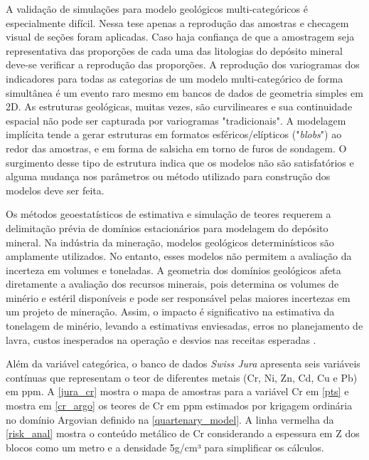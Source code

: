 A validação de simulações para modelo geológicos multi-categóricos é especialmente difícil. Nessa tese apenas a reprodução das amostras e checagem visual de seções foram aplicadas. Caso haja confiança de que a amostragem seja representativa das proporções de cada uma das litologias do depósito mineral deve-se verificar a reprodução das proporções. A reprodução dos variogramas dos indicadores para todas as categorias de um modelo multi-categórico de forma simultânea é um evento raro mesmo em bancos de dados de geometria simples em 2D. As estruturas geológicas, muitas vezes, são curvilineares e sua continuidade espacial não pode ser capturada por variogramas "tradicionais". A modelagem implícita tende a gerar estruturas em formatos esféricos/elípticos ("\textit{blobs}") ao redor das amostras, e em forma de salsicha em torno de furos de sondagem. O surgimento desse tipo de estrutura indica que os modelos não são satisfatórios e alguma mudança nos parâmetros ou método utilizado para construção dos modelos deve ser feita.

Os métodos geoestatísticos de estimativa e simulação de teores requerem a delimitação prévia de domínios estacionários para modelagem do depósito mineral. Na indústria da mineração, modelos geológicos determinísticos são amplamente utilizados. No entanto, esses modelos não permitem a avaliação da incerteza em volumes e toneladas. A geometria dos domínios geológicos afeta diretamente a avaliação dos recursos minerais, pois determina os volumes de minério e estéril disponíveis e pode ser responsável pelas maiores incertezas em um projeto de mineração. Assim, o impacto é significativo na estimativa da tonelagem de minério, levando a estimativas enviesadas, erros no planejamento de lavra, custos inesperados na operação e desvios nas receitas esperadas \cite{srivastava2005probabilistic}.

Além da variável categórica, o banco de dados \textit{Swiss Jura} apresenta seis variáveis contínuas que representam o teor de diferentes metais (Cr, Ni, Zn, Cd, Cu e Pb) em ppm. A \autoref{jura_cr} mostra o mapa de amostras para a variável Cr em \autoref{pts} e mostra em \autoref{cr_argo} os teores de Cr em ppm estimados por krigagem ordinária no domínio Argovian definido na \autoref{quartenary_model}. A linha vermelha da \autoref{risk_anal} mostra o conteúdo metálico de Cr considerando a espessura em Z dos blocos como um metro e a densidade 5g/cm³ para simplificar os cálculos.

